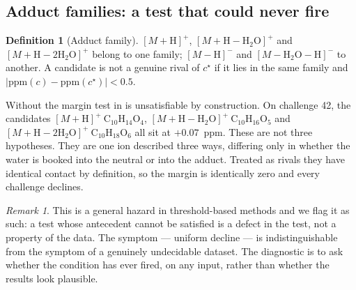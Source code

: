 \documentclass[11pt,twocolumn,a4paper]{article}
\theoremstyle{definition}
\newtheorem{definition}[theorem]{Definition}
\theoremstyle{remark}
\newtheorem{remark}[theorem]{Remark}
\newcommand{\ppm}{\mathrm{ppm}}
\begin{document}
\subsection{Adduct families: a test that could never fire}

\begin{definition}[Adduct family]
\label{def:family}
$[M+\mathrm{H}]^+$, $[M+\mathrm{H}-\mathrm{H_2O}]^+$ and
$[M+\mathrm{H}-2\mathrm{H_2O}]^+$ belong to one family; $[M-\mathrm{H}]^-$ and
$[M-\mathrm{H_2O}-\mathrm{H}]^-$ to another. A candidate is not a genuine rival
of $c^\star$ if it lies in the same family and $|\ppm(c) - \ppm(c^\star)| < 0.5$.
\end{definition}

Without  the margin test in  is unsatisfiable
by construction. On challenge 42, the candidates
$[M+\mathrm{H}]^+\ \mathrm{C_{10}H_{14}O_4}$,
$[M+\mathrm{H}-\mathrm{H_2O}]^+\ \mathrm{C_{10}H_{16}O_5}$ and
$[M+\mathrm{H}-2\mathrm{H_2O}]^+\ \mathrm{C_{10}H_{18}O_6}$ all sit at
$+0.07$~ppm. These are not three hypotheses. They are one ion described three ways,
differing only in whether the water is booked into the neutral or into the adduct.
Treated as rivals they have identical contact by definition, so the margin is
identically zero and every challenge declines.

\begin{remark}
This is a general hazard in threshold-based methods and we flag it as such: a test
whose antecedent cannot be satisfied is a defect in the test, not a property of
the data. The symptom --- uniform decline --- is indistinguishable from the
symptom of a genuinely undecidable dataset. The diagnostic is to ask whether the
condition has ever fired, on any input, rather than whether the results look
plausible.
\end{remark}
\end{document}
